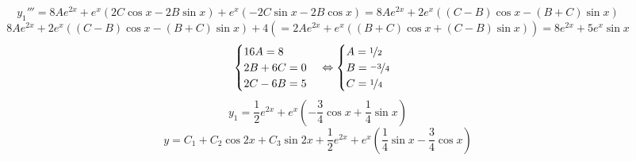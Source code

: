 \documentclass[a3paper,14pt]{article}
\begin{document}
$$y_1'''=8Ae^{2x}+e^x(2C\cos x -2B\sin x)+e^x(-2C\sin x - 2B\cos x) = 8Ae^{2x}+2e^x((C-B)\cos x - (B+C)\sin x)$$
$$8Ae^{2x}+2e^x((C-B)\cos x - (B+C)\sin x)+4(=2Ae^{2x}+e^x((B+C)\cos x +(C-B)\sin x))= 8 e^{2x}+5e^x\sin x$$
$$\begin{cases}
    16A = 8 \\
    2B+6C = 0 \\
    2C-6B = 5
\end{cases}\Leftrightarrow \begin{cases}
    A = \nicefrac{1}{2} \\
    B = \nicefrac{-3}{4} \\
    C = \nicefrac{1}{4}
\end{cases}$$
$$y_1 = \frac{1}{2}e^{2x}+e^x\left(-\frac{3}{4}\cos x+\frac{1}{4}\sin x\right)$$
$$y = C_1+C_2\cos 2x+C_3\sin2x + \frac{1}{2}e^{2x}+e^x\left(\frac{1}{4}\sin x-\frac{3}{4}\cos x\right)$$
\end{document}
